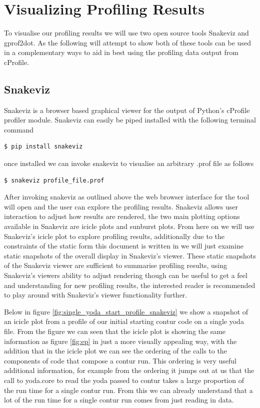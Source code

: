 \section{Visualizing Profiling Results}

To visualise our profiling results we will use two open source tools Snakeviz and gprof2dot. As the following will attempt to show both of these tools can be used in a complementary ways to aid in best using the profiling data output from cProfile.

\subsection{Snakeviz}
Snakeviz is a browser based graphical viewer for the output of Python's cProfile profiler module. Snakeviz can easily be piped installed with the following terminal command

\begin{lstlisting}[language=bash]
  $ pip install snakeviz
\end{lstlisting}

once installed we can invoke snakeviz to visualise an arbitrary .prof file as follows

\begin{lstlisting}[language=bash]
  $ snakeviz profile_file.prof
\end{lstlisting}

After invoking snakeviz as outlined above the web browser interface for the tool will open and the user can explore the profiling results. Snakeviz allows user interaction to adjust how results are rendered, the two main plotting options available in Snakeviz are icicle plots and sunburst plots. From here on we will use Snakeviz's icicle plot to explore profiling results, additionally due to the constraints of the static form this document is written in we will just examine static snapshots of the overall display in Snakeviz's viewer. These static snapshots of the Snakeviz viewer are sufficient to summarise profiling results, using Snakeviz's viewers ability to adjust rendering though can be useful to get a feel and understanding for new profiling results, the interested reader is recommended to play around with Snakeviz's viewer functionality further.

Below in figure \ref{fig:single_yoda_start_profile_snakeviz} we show a snapshot of an icicle plot from a profile of our initial starting contur code on a single yoda file. From the figure we can seen that the icicle plot is showing the same information as figure \ref{fig:ep} in just a more visually appealing way, with the addition that in the icicle plot we can see the ordering of the calls to the components of code that compose a contur run. This ordering is very useful additional information, for example from the ordering it jumps out at us that the call to yoda.core to read the yoda passed to contur takes a large proportion of the run time for a single contur run. From this we can already understand that a lot of the run time for a single contur run comes from just reading in data. 

